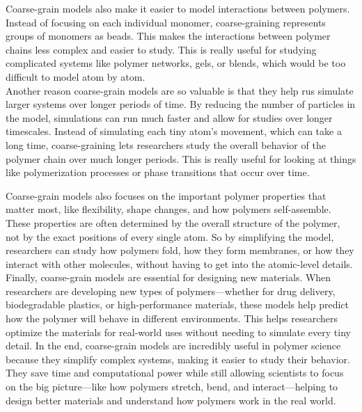 \documentclass[12pt]{article}
\begin{document}
\begin{flushleft}
	Coarse-grain models also make it easier to model interactions between polymers. Instead of focusing on each individual monomer, coarse-graining represents groups of monomers as beads. This makes the interactions between polymer chains less complex and easier to study. This is really useful for studying complicated systems like polymer networks, gels, or blends, which would be too difficult to model atom by atom.\\
	
	
	Another reason coarse-grain models are so valuable is that they help rus simulate larger systems over longer periods of time. By reducing the number of particles in the model, simulations can run much faster and allow for studies over longer timescales. Instead of simulating each tiny atom’s movement, which can take a long time, coarse-graining lets researchers study the overall behavior of the polymer chain over much longer periods. This is really useful for looking at things like polymerization processes or phase transitions that occur over time.
	
	Coarse-grain models also focuses on the important polymer properties that matter most, like flexibility, shape changes, and how polymers self-assemble. These properties are often determined by the overall structure of the polymer, not by the exact positions of every single atom. So by simplifying the model, researchers can study how polymers fold, how they form membranes, or how they interact with other molecules, without having to get into the atomic-level details.\\
	
	Finally, coarse-grain models are essential for designing new materials. When researchers are developing new types of polymers—whether for drug delivery, biodegradable plastics, or high-performance materials, these models help predict how the polymer will behave in different environments. This helps researchers optimize the materials for real-world uses without needing to simulate every tiny detail.
	In the end, coarse-grain models are incredibly useful in polymer science because they simplify complex systems, making it easier to study their behavior. They save time and computational power while still allowing scientists to focus on the big picture—like how polymers stretch, bend, and interact—helping to design better materials and understand how polymers work in the real world.
	
\vspace{-1em} 

\end{flushleft}
\end{document}
